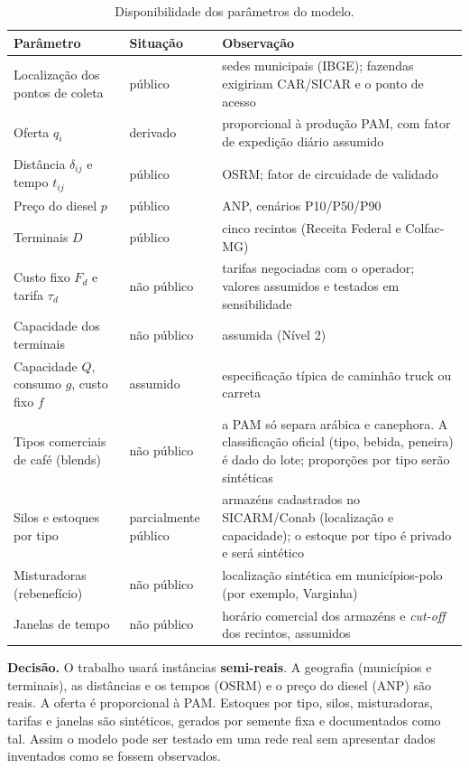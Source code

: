 \documentclass[11pt,a4paper]{article}
\begin{document}
\begin{table}[htbp]
\centering\small
\caption{Disponibilidade dos parâmetros do modelo.}\label{tab:viabilidade}
\begin{tabularx}{\linewidth}{>{\raggedright}p{4.0cm} >{\raggedright}p{2.6cm} >{\raggedright\arraybackslash}X}
\toprule
Parâmetro & Situação & Observação \\
\midrule
Localização dos pontos de coleta & público & sedes municipais (IBGE); fazendas exigiriam CAR/SICAR e o ponto de acesso \\
Oferta $q_i$ & derivado & proporcional à produção PAM, com fator de expedição diário assumido \\
Distância $\delta_{ij}$ e tempo $t_{ij}$ & público & OSRM; fator de circuidade de \CircMed{} validado \\
Preço do diesel $p$ & público & ANP, cenários P10/P50/P90 \\
Terminais $D$ & público & cinco recintos (Receita Federal e Colfac-MG) \\
Custo fixo $F_d$ e tarifa $\tau_d$ & não público & tarifas negociadas com o operador; valores assumidos e testados em
sensibilidade \\
Capacidade dos terminais & não público & assumida (Nível 2) \\
Capacidade $Q$, consumo $g$, custo fixo $f$ & assumido & especificação típica de caminhão truck ou carreta \\
Tipos comerciais de café (blends) & não público & a PAM só separa arábica e canephora. A classificação oficial
(tipo, bebida, peneira) é dado do lote; proporções por tipo serão sintéticas \\
Silos e estoques por tipo & parcialmente público & armazéns cadastrados no SICARM/Conab (localização e capacidade);
o estoque por tipo é privado e será sintético \\
Misturadoras (rebenefício) & não público & localização sintética em municípios-polo (por exemplo, Varginha) \\
Janelas de tempo & não público & horário comercial dos armazéns e \emph{cut-off} dos recintos, assumidos \\
\bottomrule
\end{tabularx}
\end{table}

\textbf{Decisão.} O trabalho usará instâncias \textbf{semi-reais}. A geografia (municípios e terminais), as distâncias e
os tempos (OSRM) e o preço do diesel (ANP) são reais. A oferta é proporcional à PAM. Estoques por tipo, silos,
misturadoras, tarifas e janelas são sintéticos, gerados por semente fixa e documentados como tal. Assim o modelo pode
ser testado em uma rede real sem apresentar dados inventados como se fossem observados.
\end{document}
